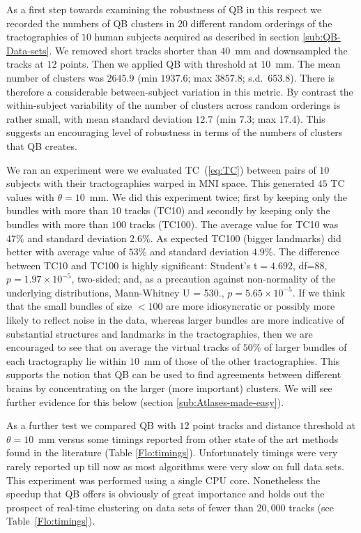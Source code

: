 \documentclass[preprint,authoryear,a4paper,10pt,onecolumn]{elsarticle}
\begin{document}
As a first step towards examining the robustness of QB in this respect
we recorded the numbers of QB clusters in $20$ different random
orderings of the tractographies of $10$ human subjects acquired as
described in section \ref{sub:QB-Data-sets}. We removed short tracks
shorter than $40$~mm and downsampled the tracks at $12$ points. Then we
applied QB with threshold at $10$~mm. The mean number of clusters was
$2645.9$ (min $1937.6$; max $3857.8$; s.d.~$653.8$). There is therefore
a considerable between-subject variation in this metric. By contrast the
within-subject variability of the number of clusters across random
orderings is rather small, with mean standard deviation $12.7$ (min
$7.3$; max $17.4$). This suggests an encouraging level of robustness in
terms of the numbers of clusters that QB creates.

We ran an experiment were we evaluated TC~(\ref{eq:TC}) between pairs of
$10$ subjects with their tractographies warped in MNI space. This
generated $45$ TC values with $\theta=10$~mm. We did
this experiment twice; first by keeping only the bundles with more than
$10$ tracks (TC10) and secondly by keeping only the bundles with more
than $100$ tracks (TC100). The average value for TC10 was $47\%$ and
standard deviation $2.6\%$. As expected TC100 (bigger landmarks) did
better with average value of $53\%$ and standard deviation $4.9\%$. The
difference between TC10 and TC100 is highly significant: Student's
t$=4.692$, df=88, $p=1.97\times10^{-5}$, two-sided; and, as a precaution
against non-normality of the underlying distributions, Mann-Whitney U =
530., $p=5.65\times10^{-5}$. If we think that the small bundles of size
$<100$ are more idiosyncratic or possibly more likely to reflect noise
in the data, whereas larger bundles are more indicative of substantial
structures and landmarks in the tractographies, then we are encouraged
to see that on average the virtual tracks of $50\%$ of larger bundles of
each tractography lie within $10$~mm of those of the other
tractographies. This supports the notion that QB can be used to find
agreements between different brains by concentrating on the larger (more
important) clusters. We will see further evidence for this below
(section \ref{sub:Atlases-made-easy}).

As a further test we compared QB with $12$ point tracks and distance
threshold at $\theta=10$~mm versus some timings reported from other
state of the art methods found in the literature (Table
\ref{Flo:timings}). Unfortunately timings were very rarely reported up
till now as most algorithms were very slow on full data sets. This
experiment was performed using a single CPU core. Nonetheless the
speedup that QB offers is obviously of great importance and holds out
the prospect of real-time clustering on data sets of fewer than $20,000$
tracks (see Table~\ref{Flo:timings}).
\end{document}
